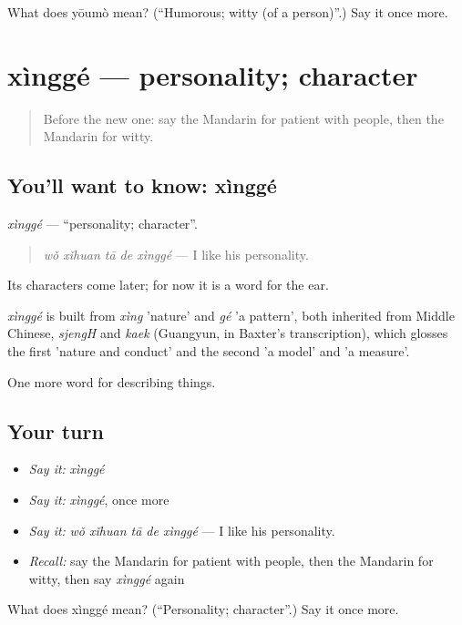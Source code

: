\begin{tcolorbox}[breakable,colback=teal!4,colframe=teal!35!black,title={Before you move on}]
What does yōumò mean? (\textquotedblleft{}Humorous; witty (of a person)\textquotedblright{}.) Say it once more.
\end{tcolorbox}
\section[xìnggé]{xìnggé — personality; character}

\label{lesson:ZH-C258-xingge}



\begin{quote}
Before the new one: say the Mandarin for patient with people, then the Mandarin for witty.
\end{quote}

\subsection*{You'll want to know: xìnggé}
\emph{xìnggé} — \textquotedblleft{}personality; character\textquotedblright{}.

\begin{quote}
\emph{wǒ xǐhuan tā de xìnggé} — I like his personality.
\end{quote}

Its characters come later; for now it is a word for the ear.

\begin{cousinweb}
\emph{xìnggé} is built from \emph{xìng} 'nature' and \emph{gé} 'a pattern', both inherited from Middle Chinese, \emph{sjengH} and \emph{kaek} (Guangyun, in Baxter's transcription), which glosses the first 'nature and conduct' and the second 'a model' and 'a measure'.
\end{cousinweb}

\begin{grammarlens}[title={What you've built}]
One more word for describing things.
\end{grammarlens}

\subsection*{Your turn}
\begin{itemize}
\raggedright
  \item \emph{Say it:} \emph{xìnggé}
  \item \emph{Say it:} \emph{xìnggé}, once more
  \item \emph{Say it:} \emph{wǒ xǐhuan tā de xìnggé} — I like his personality.
  \item \emph{Recall:} say the Mandarin for patient with people, then the Mandarin for witty, then say \emph{xìnggé} again
\end{itemize}

\begin{tcolorbox}[breakable,colback=teal!4,colframe=teal!35!black,title={Before you move on}]
What does xìnggé mean? (\textquotedblleft{}Personality; character\textquotedblright{}.) Say it once more.
\end{tcolorbox}
